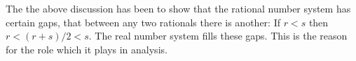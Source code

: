 \begin{remark}
  The  the above discussion has been to show that the rational number system has certain gaps,  that between any two rationals there is another: If $r < s$ then $r < (r+s)/2 < s$. The real number system fills these gaps. This is the  reason for the  role which it plays in analysis. 
\end{remark}